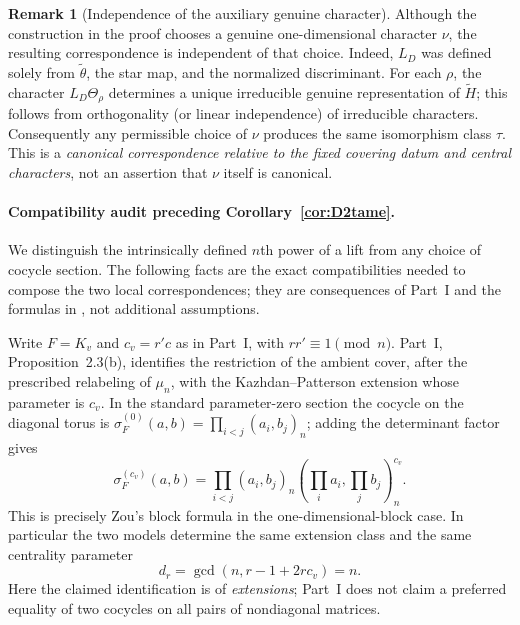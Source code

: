 \documentclass[11pt]{article}
\newcommand{\tH}{\widetilde H}
\theoremstyle{plain}
\theoremstyle{definition}
\newtheorem{remark}[theorem]{Remark}
\begin{document}
\begin{remark}[Independence of the auxiliary genuine character]
Although the construction in the proof chooses a genuine
one-dimensional character $\nu$, the resulting correspondence is
independent of that choice. Indeed, $L_D$ was defined solely from
$\widetilde\theta$, the star map, and the normalized discriminant.
For each $\rho$, the character $L_D\Theta_\rho$ determines a unique
irreducible genuine representation of $\tH$; this follows from
orthogonality (or linear independence) of irreducible characters.
Consequently any permissible choice of $\nu$ produces the same
isomorphism class $\tau$. This is a \emph{canonical correspondence
relative to the fixed covering datum and central characters}, not
an assertion that $\nu$ itself is canonical.
\end{remark}



\paragraph{Compatibility audit preceding Corollary~\ref{cor:D2tame}.}
We distinguish the intrinsically defined $n$th power of a lift from
any choice of cocycle section.  The following facts are the exact
compatibilities needed to compose the two local correspondences;
they are consequences of Part~I and the formulas in
\cite[\S\S2.2, 3.1]{Zou}, not additional assumptions.

Write $F=K_v$ and $c_v=r'c$ as in Part~I, with $rr'\equiv1\pmod n$.
Part~I, Proposition~2.3(b), identifies the restriction of the ambient
cover, after the prescribed relabeling of $\mu_n$, with the
Kazhdan--Patterson extension whose parameter is $c_v$.  In the
standard parameter-zero section the cocycle on the diagonal torus is
$\sigma_F^{(0)}(a,b)=\prod_{i<j}(a_i,b_j)_n$; adding the determinant
factor gives
\begin{equation}\label{eq:zou-cocycle-audit}
 \sigma_F^{(c_v)}(a,b)=
 \prod_{i<j}(a_i,b_j)_n
 \left(\prod_i a_i,\prod_j b_j\right)_n^{c_v}.
\end{equation}
This is precisely Zou's block formula \cite[(2.1)]{Zou} in the
one-dimensional-block case.  In particular the two models determine
the same extension class and the same centrality parameter
\[
 d_r=\gcd(n,r-1+2rc_v)=n.
\]
Here the claimed identification is of \emph{extensions}; Part~I does
not claim a preferred equality of two cocycles on all pairs of
nondiagonal matrices.
\end{document}
